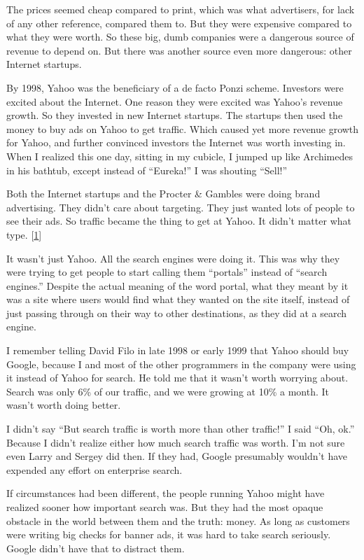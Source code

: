 The prices seemed cheap compared to print, which was what advertisers,
for lack of any other reference, compared them to. But they were
expensive compared to what they were worth. So these big, dumb companies
were a dangerous source of revenue to depend on. But there was another
source even more dangerous: other Internet startups.

By 1998, Yahoo was the beneficiary of a de facto Ponzi scheme. Investors
were excited about the Internet. One reason they were excited was
Yahoo's revenue growth. So they invested in new Internet startups. The
startups then used the money to buy ads on Yahoo to get traffic. Which
caused yet more revenue growth for Yahoo, and further convinced
investors the Internet was worth investing in. When I realized this one
day, sitting in my cubicle, I jumped up like Archimedes in his bathtub,
except instead of ``Eureka!'' I was shouting ``Sell!''

Both the Internet startups and the Procter \& Gambles were doing brand
advertising. They didn't care about targeting. They just wanted lots of
people to see their ads. So traffic became the thing to get at Yahoo. It
didn't matter what type. {[}\hyperref[f1n]{1}{]}

It wasn't just Yahoo. All the search engines were doing it. This was why
they were trying to get people to start calling them ``portals'' instead
of ``search engines.'' Despite the actual meaning of the word portal,
what they meant by it was a site where users would find what they wanted
on the site itself, instead of just passing through on their way to
other destinations, as they did at a search engine.

I remember telling David Filo in late 1998 or early 1999 that Yahoo
should buy Google, because I and most of the other programmers in the
company were using it instead of Yahoo for search. He told me that it
wasn't worth worrying about. Search was only 6\% of our traffic, and we
were growing at 10\% a month. It wasn't worth doing better.

I didn't say ``But search traffic is worth more than other traffic!'' I
said ``Oh, ok.'' Because I didn't realize either how much search traffic
was worth. I'm not sure even Larry and Sergey did then. If they had,
Google presumably wouldn't have expended any effort on enterprise
search.

If circumstances had been different, the people running Yahoo might have
realized sooner how important search was. But they had the most opaque
obstacle in the world between them and the truth: money. As long as
customers were writing big checks for banner ads, it was hard to take
search seriously. Google didn't have that to distract them.

